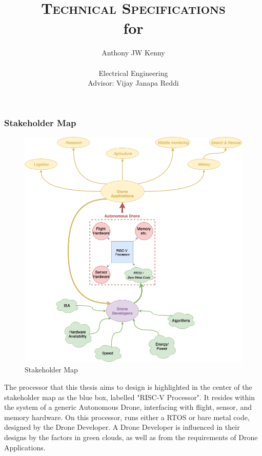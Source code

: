 \documentclass[11pt, oneside]{article}      %
\title{\textsc{Technical Specifications} \\ 
	\small{for} \\ 
	\Large{\masterThesisTitle}}
\author{Anthony JW Kenny \\ \\
        Electrical Engineering \\
        Advisor: Vijay Janapa Reddi}
\begin{document}
\maketitle






\subsubsection{Stakeholder Map} 
\begin{figure}[H]
\begin{centering}
\includegraphics[width=\linewidth]{img/stakeholderMap.png}
\caption{Stakeholder Map}
\label{fig:stakeholderMap}
\end{centering}
\end{figure}

The processor that this thesis aims to design is highlighted in the center of the stakeholder map as the blue box, labelled "RISC-V Processor". It resides within the system of a generic Autonomous Drone, interfacing with flight, sensor, and memory hardware. On this processor, runs either a \ac{RTOS} or bare metal code, designed by the Drone Developer. A Drone Developer is influenced in their designs by the factors in green clouds, as well as from the requirements of Drone Applications.
\end{document}

